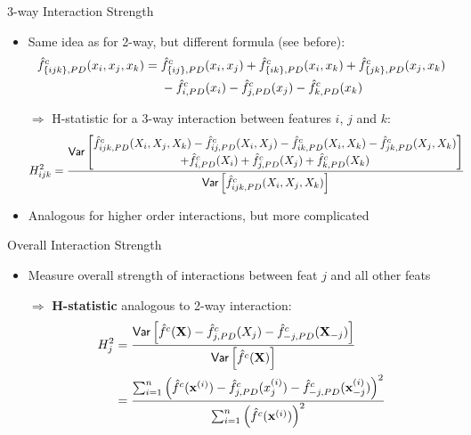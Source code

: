 \documentclass[10pt,compress,t,notes=noshow, xcolor=table]{beamer}
\newcommand{\Xv}{\mathbf{X}} %
\begin{document}
\begin{frame}{3-way Interaction Strength}
\begin{itemize}
    \item Same idea as for 2-way, but different formula (see before): %
    \begin{align*}
        \hat{f}^c_{\{ijk\}, PD}(x_i, x_j, x_k)
        =\; & \hat{f}^c_{\{ij\}, PD}(x_i, x_j) + \hat{f}^c_{\{ik\}, PD}(x_i, x_k) + \hat{f}^c_{\{jk\}, PD}(x_j, x_k) \\
        & - \hat{f}^c_{i, PD}(x_i) - \hat{f}^c_{j, PD}(x_j) - \hat{f}^c_{k, PD}(x_k)
    \end{align*}
    \item[$\Rightarrow$] H-statistic for a 3-way interaction between features $i$, $j$ and $k$:
    \begin{align*}
        H^2_{ijk}
        & = \frac{ \mathsf{Var} \left[ \substack{\textstyle
        \hat{f}^c_{ijk, PD}(X_i, X_j, X_k)
        - \hat{f}^c_{ij, PD}(X_i, X_j) - \hat{f}^c_{ik, PD}(X_i, X_k) - \hat{f}^c_{jk, PD}(X_j, X_k) \\ \textstyle
        + \hat{f}^c_{i, PD}(X_i) + \hat{f}^c_{j, PD}(X_j) + \hat{f}^c_{k, PD}(X_k)
        }
        \right]
        }{ \mathsf{Var} \left[ \hat{f}^c_{ijk, PD}(X_i, X_j, X_k) \right] }
    \end{align*}
    \item Analogous for higher order interactions, but more complicated
\end{itemize}
\end{frame}



\begin{frame}{Overall Interaction Strength}

\begin{itemize}
    \item Measure overall strength of interactions between feat $j$ and all other feats
    \item[$\Rightarrow$] \textbf{H-statistic} analogous to 2-way interaction:
    \begin{align*}
        H^2_{j}
        & = \frac{
            \var \left[ \fh^c(\Xv) - \fh^c_{j, PD}(X_j) - \fh^c_{-j, PD}(\Xv_{-j}) \right]
        }{ \var \left[ \fh^c(\Xv) \right] } \\
        & = \frac{
            \sum_{i=1}^n \left( \fh^c(\xv^{(i)}) - \fh^c_{j, PD}(x_j^{(i)}) - \fh^c_{-j, PD}(\xv_{-j}^{(i)})  \right)^2
        }{
            \sum_{i=1}^n \left( \fh^c(\xv^{(i)}) \right)^2
        }
    \end{align*}
\end{itemize}


\end{frame}
\end{document}
